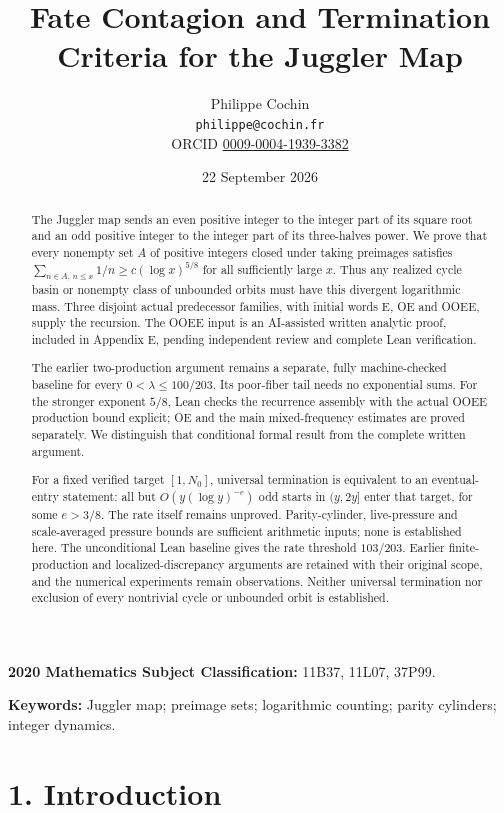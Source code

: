 \documentclass[11pt,a4paper]{article}
\title{Fate Contagion and Termination Criteria for the Juggler Map}
\author{Philippe Cochin \\ \texttt{philippe@cochin.fr} \\
  \small ORCID \href{https://orcid.org/0009-0004-1939-3382}{0009-0004-1939-3382}}
\date{22 September 2026}
\begin{document}
\maketitle
\begin{abstract}

The Juggler map sends an even positive integer to the integer part of
its square root and an odd positive integer to the integer part of its
three-halves power. We prove that every nonempty set \(A\) of positive
integers closed under taking preimages satisfies
\(\sum_{n\in A,\,n\le x}1/n\ge c(\log x)^{5/8}\) for all sufficiently
large \(x\). Thus any realized cycle basin or nonempty class of
unbounded orbits must have this divergent logarithmic mass. Three
disjoint actual predecessor families, with initial words E, OE and OOEE,
supply the recursion. The OOEE input is an AI-assisted written analytic
proof, included in Appendix E, pending independent review and complete
Lean verification.

The earlier two-production argument remains a separate, fully
machine-checked baseline for every \(0<\lambda\le100/203\). Its
poor-fiber tail needs no exponential sums. For the stronger exponent
\(5/8\), Lean checks the recurrence assembly with the actual OOEE
production bound explicit; OE and the main mixed-frequency estimates are
proved separately. We distinguish that conditional formal result from
the complete written argument.

For a fixed verified target \([1,N_0]\), universal termination is
equivalent to an eventual-entry statement: all but \(O(y(\log y)^{-e})\)
odd starts in \((y,2y]\) enter that target, for some \(e>3/8\). The rate
itself remains unproved. Parity-cylinder, live-pressure and
scale-averaged pressure bounds are sufficient arithmetic inputs; none is
established here. The unconditional Lean baseline gives the rate
threshold \(103/203\). Earlier finite-production and
localized-discrepancy arguments are retained with their original scope,
and the numerical experiments remain observations. Neither universal
termination nor exclusion of every nontrivial cycle or unbounded orbit
is established.

\end{abstract}

\textbf{2020 Mathematics Subject Classification:} 11B37, 11L07, 37P99.

\textbf{Keywords:} Juggler map; preimage sets; logarithmic counting;
parity cylinders; integer dynamics.

\section{1. Introduction}\label{introduction}
\end{document}
